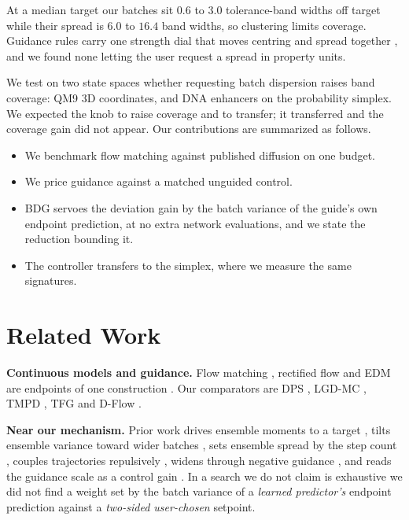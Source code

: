 At a median target our batches sit $0.6$ to $3.0$ tolerance-band widths off target while
their spread is $6.0$ to $16.4$ band widths, so clustering limits coverage. Guidance
rules carry one strength dial that
moves centring and spread together \citep{ho2022classifier,zheng2023guided}, and we
found none letting the user request a spread in property units.

We test on two state spaces whether requesting batch dispersion raises band coverage:
QM9 3D coordinates, and DNA enhancers on the probability simplex. We expected the knob
to raise coverage and to transfer; it transferred and the coverage gain did not appear.
Our contributions are summarized as follows.
\begin{itemize}[leftmargin=1.1em,itemsep=0pt,topsep=1pt,parsep=0pt]
  \item We benchmark flow matching against published diffusion on one budget.
  \item We price guidance against a matched unguided control.
  \item BDG servoes the deviation gain by the batch variance of the guide's own
    endpoint prediction, at no extra network evaluations, and we state the reduction
    bounding it.
  \item The controller transfers to the simplex, where we measure the same signatures.
\end{itemize}

\section{Related Work}

\textbf{Continuous models and guidance.} Flow matching \citep{lipman2022flow},
rectified flow \citep{liu2022flow} and EDM \citep{karras2022elucidating} are endpoints
of one construction \citep{albergo2025stochastic,ma2024sit}. Our comparators are
DPS \citep{chung2023dps}, LGD-MC \citep{song2023lgd}, TMPD \citep{boys2024tmpd}, TFG
\citep{ye2024tfg} and D-Flow \citep{benhamu2024dflow}.

\textbf{Near our mechanism.} Prior work drives ensemble moments to a target
\citep{mgd2026moment}, tilts ensemble variance toward wider batches
\citep{vtd2026variance}, sets ensemble spread by the step count
\citep{ensemblevar2025}, couples trajectories
repulsively \citep{corso2024particle}, widens through negative guidance
\citep{ventura2026negative}, and reads the guidance scale as a control gain
\citep{cfgctrl2026,fbg2025feedback}. In a search we do not claim is exhaustive we did
not find a weight set by the batch variance of a \emph{learned predictor's} endpoint
prediction against a \emph{two-sided user-chosen} setpoint.

